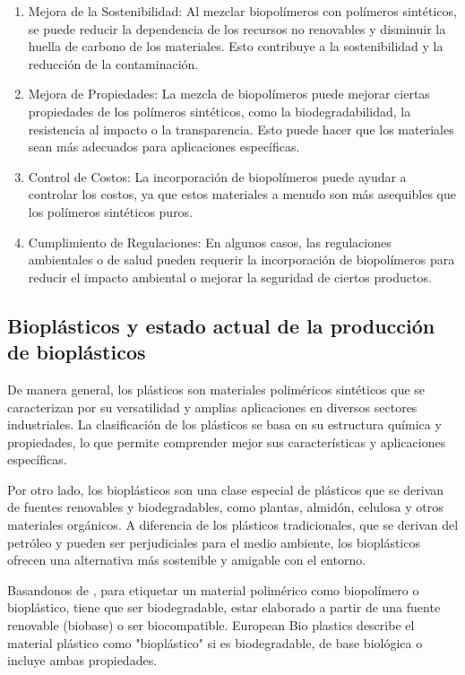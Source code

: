 \documentclass[14pt,oneside]{extarticle} %
\begin{document}
\begin{enumerate}
    \item Mejora de la Sostenibilidad: Al mezclar biopolímeros con polímeros sintéticos, se puede reducir la dependencia de los recursos no renovables y disminuir la huella de carbono de los materiales. Esto contribuye a la sostenibilidad y la reducción de la contaminación.
    \item Mejora de Propiedades: La mezcla de biopolímeros puede mejorar ciertas propiedades de los polímeros sintéticos, como la biodegradabilidad, la resistencia al impacto o la transparencia. Esto puede hacer que los materiales sean más adecuados para aplicaciones específicas.
    \item Control de Costos: La incorporación de biopolímeros puede ayudar a controlar los costos, ya que estos materiales a menudo son más asequibles que los polímeros sintéticos puros.
    \item Cumplimiento de Regulaciones: En algunos casos, las regulaciones ambientales o de salud pueden requerir la incorporación de biopolímeros para reducir el impacto ambiental o mejorar la seguridad de ciertos productos.  
\end{enumerate}

\subsection{Bioplásticos y estado actual de la producción de bioplásticos}

De manera general, los plásticos son materiales poliméricos sintéticos que se caracterizan por su versatilidad y amplias aplicaciones en diversos sectores industriales. La clasificación de los plásticos se basa en su estructura química y propiedades, lo que permite comprender mejor sus características y aplicaciones específicas. 

Por otro lado, los bioplásticos son una clase especial de plásticos que se derivan de fuentes renovables y biodegradables, como plantas, almidón, celulosa y otros materiales orgánicos. A diferencia de los plásticos tradicionales, que se derivan del petróleo y pueden ser perjudiciales para el medio ambiente, los bioplásticos ofrecen una alternativa más sostenible y amigable con el entorno. 

Basandonos de \cite{joogi2020}, para etiquetar un material polimérico como biopolímero o bioplástico, tiene que ser biodegradable, estar elaborado a partir de una fuente renovable (biobase) o ser biocompatible. European Bio plastics describe el material plástico como "bioplástico" si es biodegradable, de base biológica o incluye ambas propiedades. 
\end{document}
